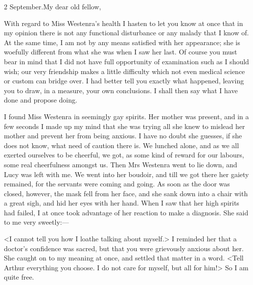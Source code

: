 \begin{mail}{2 September.}{My dear old fellow,}

With regard to Miss Westenra's health I hasten to let you know at once that in my opinion there is not any functional disturbance or any malady that I know of. At the same time, I am not by any means satisfied with her appearance; she is woefully different from what she was when I saw her last. Of course you must bear in mind that I did not have full opportunity of examination such as I should wish; our very friendship makes a little difficulty which not even medical science or custom can bridge over. I had better tell you exactly what happened, leaving you to draw, in a measure, your own conclusions. I shall then say what I have done and propose doing.

I found Miss Westenra in seemingly gay spirits. Her mother was present, and in a few seconds I made up my mind that she was trying all she knew to mislead her mother and prevent her from being anxious. I have no doubt she guesses, if she does not know, what need of caution there is. We lunched alone, and as we all exerted ourselves to be cheerful, we got, as some kind of reward for our labours, some real cheerfulness amongst us. Then Mrs Westenra went to lie down, and Lucy was left with me. We went into her boudoir, and till we got there her gaiety remained, for the servants were coming and going. As soon as the door was closed, however, the mask fell from her face, and she sank down into a chair with a great sigh, and hid her eyes with her hand. When I saw that her high spirits had failed, I at once took advantage of her reaction to make a diagnosis. She said to me very sweetly:—

<I cannot tell you how I loathe talking about myself.> I reminded her that a doctor's confidence was sacred, but that you were grievously anxious about her. She caught on to my meaning at once, and settled that matter in a word. <Tell Arthur everything you choose. I do not care for myself, but all for him!> So I am quite free.


\end{mail}
